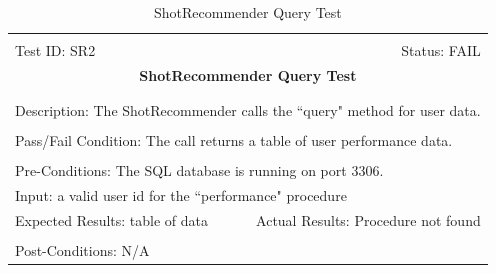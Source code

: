 \documentclass[11pt]{article}
\begin{document}
\begin{center}
\begin{table}[H]
\begin{tabular}{|l r|}\hline&\\[-2mm]
	Test ID: SR2	&Status: FAIL\\[-3mm]
	\multicolumn{2}{|c|}{\textbf{\large{ShotRecommender Query Test}}}\\&\\\hline&\\[-3mm]
	\multicolumn{2}{|p{\textwidth}|}{Description: The ShotRecommender calls the ``query" method for user data.}\\[1mm]\hline&\\[-3mm]
	\multicolumn{2}{|p{\textwidth}|}{Pass/Fail Condition: The call returns a table of user performance data.}\\[1mm]\hline&\\[-3mm]
	\multicolumn{2}{|p{\textwidth}|}{Pre-Conditions: The SQL database is running on port 3306.}\\[4mm]
	\multicolumn{2}{|p{\textwidth}|}{Input: a valid user id for the ``performance" procedure}\\[2mm]\hline
	\multicolumn{1}{|p{0.49\textwidth}}{Expected Results: table of data}	&\multicolumn{1}{|p{0.45\textwidth}|}{Actual Results: Procedure not found}\\\hline&\\[-3mm]
	\multicolumn{2}{|p{\textwidth}|}{Post-Conditions: N/A}\\\hline
\end{tabular}
\caption{ShotRecommender Query Test}
\end{table}
\end{center}
\end{document}
